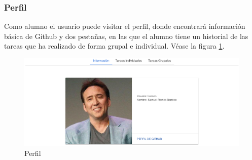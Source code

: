 \subsubsection{Perfil}

Como alumno el usuario puede visitar el perfil, donde encontrará información básica de Github y dos pestañas, en las que el alumno tiene un historial de las tareas que ha realizado de forma grupal e individual.
Véase la figura \ref{fig:Perfil}.

\begin{figure}[!th]
\begin{center}
\includegraphics[scale=0.5]{images/profile}
\caption{Perfil}
\label{fig:Perfil}
\end{center}
\end{figure}


